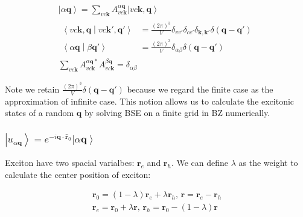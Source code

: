 \begin{equation}
  \begin{gathered}
    \left| \alpha \boldsymbol{q} \right\rangle 
    = \sum_{vc\boldsymbol{k}} A_{vc\boldsymbol{k}}^{\alpha \boldsymbol{q}}
      \left| v c \boldsymbol{k}, \boldsymbol{q} \right\rangle \\
    \begin{aligned}
      \left\langle v c \boldsymbol{k}, \boldsymbol{q} \middle| v c \boldsymbol{k}', \boldsymbol{q}' \right\rangle
        &= \frac{(2\pi)^3}{V} \delta_{vv'} \delta_{cc'} \delta_{\boldsymbol{k},\boldsymbol{k}'} \delta(\boldsymbol{q}-\boldsymbol{q}') \\
      \left\langle \alpha \boldsymbol{q} \middle| \beta \boldsymbol{q}' \right\rangle
        &= \frac{(2\pi)^3}{V} \delta_{\alpha\beta} \delta(\boldsymbol{q}-\boldsymbol{q}') 
    \end{aligned} \\
    \sum_{vc\boldsymbol{k}} A_{vc\boldsymbol{k}}^{\alpha \boldsymbol{q}*} A_{vc\boldsymbol{k}}^{\beta \boldsymbol{q}}
      = \delta_{\alpha\beta}
  \end{gathered}
\end{equation}

\noindent
Note we retain $\frac{(2\pi)^3}{V}\delta(\boldsymbol{q}-\boldsymbol{q}')$ because we regard the finite case as the approximation of infinite case.
This notion allows us to calculate the excitonic states of a random $\boldsymbol{q}$ by solving BSE on a finite grid in BZ numerically.



\subsubsection{$\left| u_{\alpha\boldsymbol{q}} \right\rangle = e^{-i\boldsymbol{q} \cdot \hat{\boldsymbol{r}}_0} \left| \alpha\boldsymbol{q} \right\rangle$}

Exciton have two spacial varialbes: $\boldsymbol{r}_e$ and $\boldsymbol{r}_h$.
We can define $\lambda$ as the weight to calculate the center position of exciton:

\begin{equation}
  \begin{aligned}
    \boldsymbol{r}_0 = (1-\lambda) \boldsymbol{r}_e + \lambda \boldsymbol{r}_h ,\, 
    \boldsymbol{r} = \boldsymbol{r}_e-\boldsymbol{r}_h \\
    \boldsymbol{r}_e = \boldsymbol{r}_0 + \lambda \boldsymbol{r} ,\,
    \boldsymbol{r}_h = \boldsymbol{r}_0 - (1-\lambda) \boldsymbol{r} 
  \end{aligned}
\end{equation}

